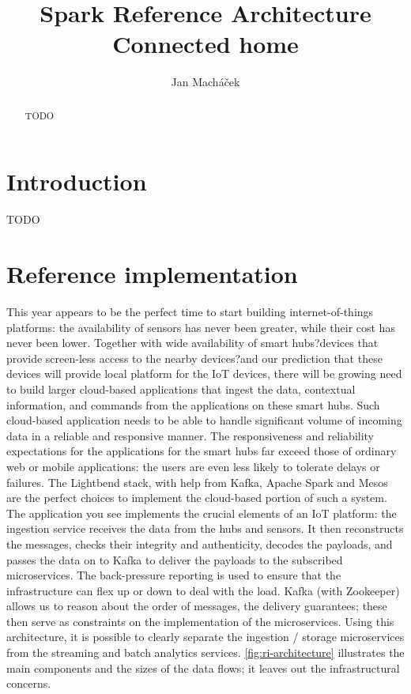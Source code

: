 \documentclass[a4paper, 10 pt, conference]{IEEEtran}
\title{Spark Reference Architecture \\ Connected home}
\author{Jan Mach{\'a}\v{c}ek%
}
\begin{document}
\maketitle
\thispagestyle{empty}
\pagestyle{empty}

\begin{abstract}

TODO

\end{abstract}


\section{Introduction}

TODO

\section{Reference implementation}

This year appears to be the perfect time to start building internet-of-things platforms: the availability of sensors has never been greater, while their cost has never been lower. Together with wide availability of smart hubs?devices that provide screen-less access to the nearby devices?and our prediction that these devices will provide local platform for the IoT devices, there will be growing need to build larger cloud-based applications that ingest the data, contextual information, and commands from the applications on these smart hubs.
Such cloud-based application needs to be able to handle significant volume of incoming data in a reliable and responsive manner. The responsiveness and reliability expectations for the applications for the smart hubs far exceed those of ordinary web or mobile applications: the users are even less likely to tolerate delays or failures. 
The Lightbend stack, with help from Kafka, Apache Spark and Mesos are the perfect choices to implement the cloud-based portion of such a system. The application you see implements the crucial elements of an IoT platform: the ingestion service receives the data from the hubs and sensors. It then reconstructs the messages, checks their integrity and authenticity, decodes the payloads, and passes the data on to Kafka to deliver the payloads to the subscribed microservices. The back-pressure reporting is used to ensure that the infrastructure can flex up or down to deal with the load. Kafka (with Zookeeper) allows us to reason about the order of messages, the delivery guarantees; these then serve as constraints on the implementation of the microservices. Using this architecture, it is possible to clearly separate the ingestion / storage microservices from the streaming and batch analytics services. \autoref{fig:ri-architecture} illustrates the main components and the sizes of the data flows; it leaves out the infrastructural concerns.
\end{document}
